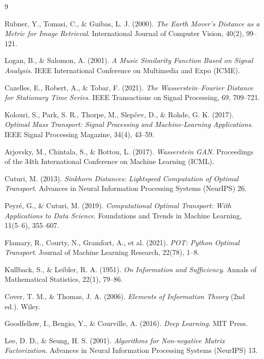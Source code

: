 \documentclass[11pt,a4paper]{article}
\begin{document}
\begin{thebibliography}{9}

Rubner, Y., Tomasi, C., \& Guibas, L. J. (2000).
\textit{The Earth Mover's Distance as a Metric for Image Retrieval}.
International Journal of Computer Vision, 40(2), 99--121.

Logan, B., \& Salomon, A. (2001).
\textit{A Music Similarity Function Based on Signal Analysis}.
IEEE International Conference on Multimedia and Expo (ICME).

Cazelles, E., Robert, A., \& Tobar, F. (2021).
\textit{The Wasserstein--Fourier Distance for Stationary Time Series}.
IEEE Transactions on Signal Processing, 69, 709--721.

Kolouri, S., Park, S. R., Thorpe, M., Slep\v{c}ev, D., \& Rohde, G. K. (2017).
\textit{Optimal Mass Transport: Signal Processing and Machine-Learning Applications}.
IEEE Signal Processing Magazine, 34(4), 43--59.

Arjovsky, M., Chintala, S., \& Bottou, L. (2017).
\textit{Wasserstein GAN}.
Proceedings of the 34th International Conference on Machine Learning (ICML).

Cuturi, M. (2013).
\textit{Sinkhorn Distances: Lightspeed Computation of Optimal Transport}.
Advances in Neural Information Processing Systems (NeurIPS) 26.

Peyré, G., \& Cuturi, M. (2019).
\textit{Computational Optimal Transport: With Applications to Data Science}.
Foundations and Trends in Machine Learning, 11(5--6), 355--607.

Flamary, R., Courty, N., Gramfort, A., et al. (2021).
\textit{POT: Python Optimal Transport}.
Journal of Machine Learning Research, 22(78), 1--8.

Kullback, S., \& Leibler, R. A. (1951).
\textit{On Information and Sufficiency}.
Annals of Mathematical Statistics, 22(1), 79--86.

Cover, T. M., \& Thomas, J. A. (2006).
\textit{Elements of Information Theory} (2nd ed.).
Wiley.

Goodfellow, I., Bengio, Y., \& Courville, A. (2016).
\textit{Deep Learning}.
MIT Press.

Lee, D. D., \& Seung, H. S. (2001).
\textit{Algorithms for Non-negative Matrix Factorization}.
Advances in Neural Information Processing Systems (NeurIPS) 13.


\end{thebibliography}
\end{document}

